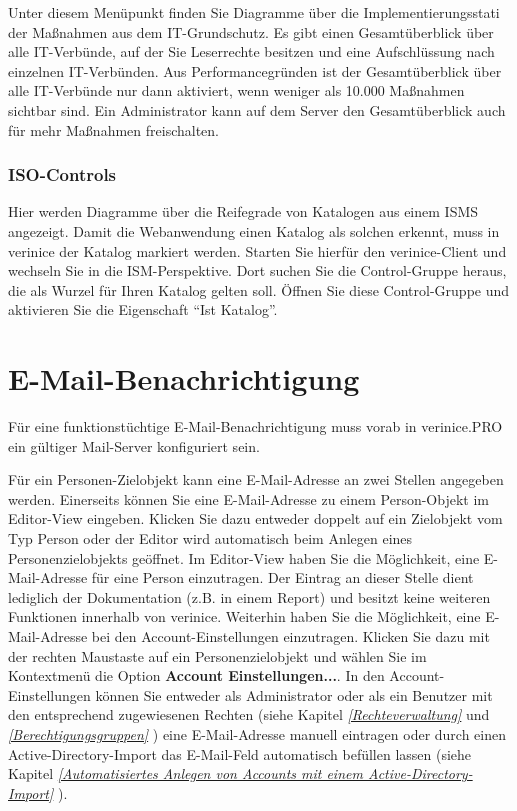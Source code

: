\documentclass[a4paper,10pt]{book}
\begin{document}
Unter diesem Menüpunkt finden Sie Diagramme über die
Implementierungsstati der Maßnahmen aus dem IT-Grundschutz. Es gibt
einen Gesamtüberblick über alle IT-Verbünde, auf der Sie Leserrechte
besitzen und eine Aufschlüssung nach einzelnen IT-Verbünden. Aus 
Performancegründen ist der Gesamtüberblick über alle IT-Verbünde nur dann 
aktiviert, wenn weniger als 10.000 Maßnahmen sichtbar sind. Ein 
Administrator kann auf dem Server den Gesamtüberblick auch für mehr 
Maßnahmen freischalten.

\subsubsection{ISO-Controls}
\label{sec:iso-controls}

Hier werden Diagramme über die Reifegrade von Katalogen aus einem ISMS
angezeigt. Damit die Webanwendung einen Katalog als solchen erkennt,
muss in verinice der Katalog markiert werden. Starten Sie hierfür den
verinice-Client und wechseln Sie in die ISM-Perspektive. Dort suchen
Sie die Control-Gruppe heraus, die als Wurzel für Ihren Katalog gelten
soll. Öffnen Sie diese Control-Gruppe und aktivieren Sie die
Eigenschaft ``Ist Katalog''.


\section{E-Mail-Benachrichtigung} \label{E-Mail-Benachrichtigung}
Für eine funktionstüchtige E-Mail-Benachrichtigung muss vorab in verinice.PRO
ein gültiger Mail-Server konfiguriert sein.

Für ein Personen-Zielobjekt kann eine E-Mail-Adresse an zwei Stellen angegeben
werden. Einerseits können Sie eine E-Mail-Adresse zu einem Person-Objekt im
Editor-View eingeben. Klicken Sie dazu entweder doppelt auf ein Zielobjekt vom
Typ Person oder der Editor wird automatisch beim Anlegen eines
Personenzielobjekts geöffnet. Im Editor-View haben Sie die Möglichkeit, eine
E-Mail-Adresse für eine Person einzutragen. Der Eintrag an dieser Stelle dient
lediglich der Dokumentation (z.B. in einem Report) und besitzt keine weiteren
Funktionen innerhalb von verinice. Weiterhin haben Sie die Möglichkeit, eine
E-Mail-Adresse bei den Account-Einstellungen einzutragen. Klicken Sie dazu mit
der rechten Maustaste auf ein Personenzielobjekt und wählen Sie im Kontextmenü
die Option \textbf{Account Einstellungen...}. In den Account-Einstellungen
können Sie entweder als Administrator oder als ein Benutzer mit den entsprechend
zugewiesenen Rechten (siehe Kapitel {\em \ref{Rechteverwaltung}
} und {\em \ref{Berechtigungsgruppen}
}) eine E-Mail-Adresse manuell eintragen oder
durch einen Active-Directory-Import das E-Mail-Feld automatisch befüllen lassen
(siehe Kapitel {\em \ref{Automatisiertes Anlegen von Accounts mit einem
Active-Directory-Import} }).
\end{document}
